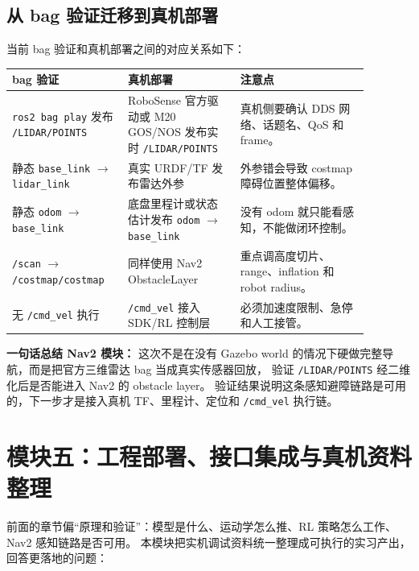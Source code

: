 \documentclass[UTF8,11pt,a4paper]{ctexart}
\begin{document}
\subsection{从 bag 验证迁移到真机部署}

当前 bag 验证和真机部署之间的对应关系如下：

\begin{center}
\renewcommand{\arraystretch}{1.25}
\begin{tabular}{p{0.28\linewidth}p{0.28\linewidth}p{0.32\linewidth}}
\toprule
\textbf{bag 验证} & \textbf{真机部署} & \textbf{注意点}\\
\midrule
\texttt{ros2 bag play} 发布 \texttt{/LIDAR/POINTS} &
RoboSense 官方驱动或 M20 GOS/NOS 发布实时 \texttt{/LIDAR/POINTS} &
真机侧要确认 DDS 网络、话题名、QoS 和 frame。\\
静态 \texttt{base\_link} \(\rightarrow\) \texttt{lidar\_link} &
真实 URDF/TF 发布雷达外参 &
外参错会导致 costmap 障碍位置整体偏移。\\
静态 \texttt{odom} \(\rightarrow\) \texttt{base\_link} &
底盘里程计或状态估计发布 \texttt{odom} \(\rightarrow\) \texttt{base\_link} &
没有 odom 就只能看感知，不能做闭环控制。\\
\texttt{/scan} \(\rightarrow\) \texttt{/costmap/costmap} &
同样使用 Nav2 ObstacleLayer &
重点调高度切片、range、inflation 和 robot radius。\\
无 \texttt{/cmd\_vel} 执行 &
\texttt{/cmd\_vel} 接入 SDK/RL 控制层 &
必须加速度限制、急停和人工接管。\\
\bottomrule
\end{tabular}
\end{center}

\begin{answerbox}
\textbf{一句话总结 Nav2 模块：}
这次不是在没有 Gazebo world 的情况下硬做完整导航，而是把官方三维雷达 bag 当成真实传感器回放，
验证 \texttt{/LIDAR/POINTS} 经二维化后是否能进入 Nav2 的 obstacle layer。
验证结果说明这条感知避障链路是可用的，下一步才是接入真机 TF、里程计、定位和 \texttt{/cmd\_vel} 执行链。
\end{answerbox}

\section{模块五：工程部署、接口集成与真机资料整理}

前面的章节偏“原理和验证”：模型是什么、运动学怎么推、RL 策略怎么工作、Nav2 感知链路是否可用。
本模块把实机调试资料统一整理成可执行的实习产出，回答更落地的问题：
\end{document}
